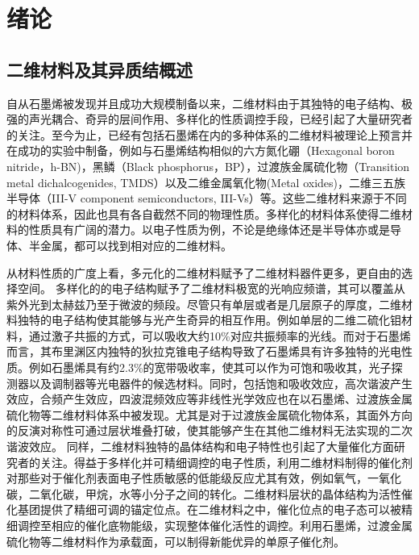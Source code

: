 \chapter{绪\hspace{6pt}论}

\section{二维材料及其异质结概述}
自从石墨烯被发现并且成功大规模制备以来，二维材料由于其独特的电子结构、极强的声光耦合、奇异的层间作用、多样化的性质调控手段，已经引起了大量研究者的关注。至今为止，已经有包括石墨烯在内的多种体系的二维材料被理论上预言并在成功的实验中制备，例如与石墨烯结构相似的六方氮化硼（Hexagonal boron nitride，h-BN)，黑鳞（Black phosphorus，BP），过渡族金属硫化物（Transition metal dichalcogenides, TMDS）以及二维金属氧化物(Metal oxides)，二维三五族半导体（III-V component semiconductors, III-Vs）等。这些二维材料来源于不同的材料体系，因此也具有各自截然不同的物理性质。多样化的材料体系使得二维材料的性质具有广阔的潜力。以电子性质为例，不论是绝缘体还是半导体亦或是导体、半金属，都可以找到相对应的二维材料。

从材料性质的广度上看，多元化的二维材料赋予了二维材料器件更多，更自由的选择空间。
多样化的的电子结构赋予了二维材料极宽的光响应频谱，其可以覆盖从紫外光到太赫兹乃至于微波的频段。尽管只有单层或者是几层原子的厚度，二维材料独特的电子结构使其能够与光产生奇异的相互作用。例如单层的二维二硫化钼材料，通过激子共振的方式，可以吸收大约10\%对应共振频率的光线。而对于石墨烯而言，其布里渊区内独特的狄拉克锥电子结构导致了石墨烯具有许多独特的光电性质。例如石墨烯具有约2.3\%的宽带吸收率，使其可以作为可饱和吸收其，光子探测器以及调制器等光电器件的候选材料。同时，包括饱和吸收效应，高次谐波产生效应，合频产生效应，四波混频效应等非线性光学效应也在以石墨烯、过渡族金属硫化物等二维材料体系中被发现。尤其是对于过渡族金属硫化物体系，其面外方向的反演对称性可通过层状堆叠打破，使其能够产生在其他二维材料无法实现的二次谐波效应。
同样，二维材料独特的晶体结构和电子特性也引起了大量催化方面研究者的关注。得益于多样化并可精细调控的电子性质，利用二维材料制得的催化剂对那些对于催化剂表面电子性质敏感的低能级反应尤其有效，例如氧气，一氧化碳，二氧化碳，甲烷，水等小分子之间的转化。二维材料层状的晶体结构为活性催化基团提供了精细可调的锚定位点。在二维材料之中，催化位点的电子态可以被精细调控至相应的催化底物能级，实现整体催化活性的调控。利用石墨烯，过渡金属硫化物等二维材料作为承载面，可以制得新能优异的单原子催化剂。


